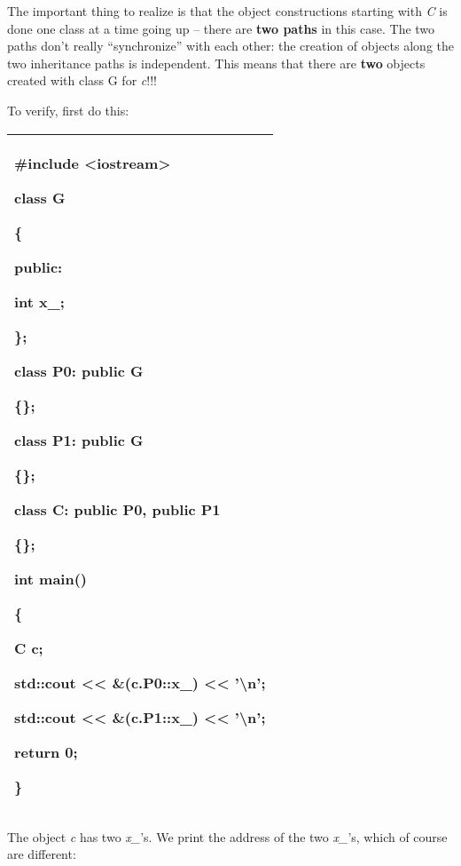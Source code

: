 \documentclass[
]{article}
\begin{document}
The important thing to realize is that the object constructions starting
with \emph{C} is done one class at a time going up -- there are
\textbf{two paths} in this case. The two paths don't really
``synchronize'' with each other: the creation of objects along the two
inheritance paths is independent. This means that there are \textbf{two}
objects created with class G for \emph{c}!!!

To verify, first do this:

\begin{longtable}[]{@{}l@{}}
\toprule
\endhead
\begin{minipage}[t]{0.97\columnwidth}\raggedright
\#include \textless iostream\textgreater{}

class G

\{

public:

int x\_;

\};

class P0: public G

\{\};

class P1: public G

\{\};

class C: public P0, public P1

\{\};

int main()

\{

C c;

std::cout \textless\textless{} \&(c.P0::x\_) \textless\textless{}
'\textbackslash n';

std::cout \textless\textless{} \&(c.P1::x\_) \textless\textless{}
'\textbackslash n';

return 0;

\}\strut
\end{minipage}\tabularnewline
\bottomrule
\end{longtable}

The object \emph{c} has two \emph{x\_}'s. We print the address of the
two \emph{x\_}'s, which of course are different:
\end{document}
